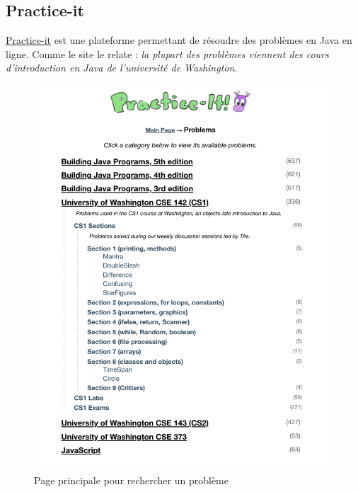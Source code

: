 \pagebreak
\subsection*{Practice-it}

\href{https://practiceit.cs.washington.edu/problem/list}{Practice-it} est une plateforme permettant de résoudre des problèmes en Java en ligne. Comme le site le relate : \textit{la plupart des problèmes viennent des cours d'introduction en Java de l'université de Washington}.

\begin{figure}[H]
    \includegraphics[width=\textwidth,height=0.35\textheight,keepaspectratio]{images/comparison/practice-it-1.png}
    \centering
    \caption[Practice-it : page principale pour rechercher un problème]{Page principale pour rechercher un problème}
\end{figure}

